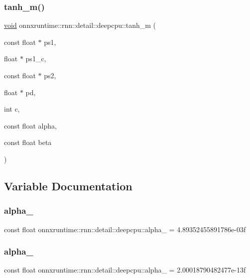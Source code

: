 \subsubsection{\texorpdfstring{tanh\+\_\+m()}{tanh\_m()}}
{\footnotesize\ttfamily \mbox{\hyperlink{mlasi_8h_a88f941d423cb2a819b70a1358982b1a6}{void}} onnxruntime\+::rnn\+::detail\+::deepcpu\+::tanh\+\_\+m (\begin{DoxyParamCaption}\item[{const float $\ast$}]{ps1,  }\item[{float $\ast$}]{ps1\+\_\+c,  }\item[{const float $\ast$}]{ps2,  }\item[{float $\ast$}]{pd,  }\item[{int}]{c,  }\item[{const float}]{alpha,  }\item[{const float}]{beta }\end{DoxyParamCaption})}



\subsection{Variable Documentation}
\mbox{\label{namespaceonnxruntime_1_1rnn_1_1detail_1_1deepcpu_a4154e74f0cb2dfec9e757e9f5711852b}} 
\subsubsection{\texorpdfstring{alpha\+\_}{alpha\_1}}
{\footnotesize\ttfamily const float onnxruntime\+::rnn\+::detail\+::deepcpu\+::alpha\+\_ = 4.\+89352455891786e-\/03f}

\mbox{\label{namespaceonnxruntime_1_1rnn_1_1detail_1_1deepcpu_a0935025c2ccffdf953a545ace9496992}} 
\subsubsection{\texorpdfstring{alpha\+\_}{alpha\_11}}
{\footnotesize\ttfamily const float onnxruntime\+::rnn\+::detail\+::deepcpu\+::alpha\+\_ = 2.\+00018790482477e-\/13f}


